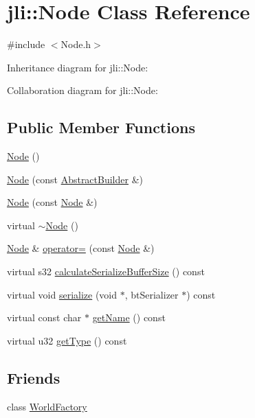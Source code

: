 \hypertarget{classjli_1_1_node}{\section{jli\+:\+:Node Class Reference}
\label{classjli_1_1_node}
}


{\ttfamily \#include $<$Node.\+h$>$}



Inheritance diagram for jli\+:\+:Node\+:


Collaboration diagram for jli\+:\+:Node\+:
\subsection*{Public Member Functions}
\begin{DoxyCompactItemize}
\item 
\hyperlink{classjli_1_1_node_ad3ae8427886d6e7375c62a7fb2100c4c}{Node} ()
\item 
\hyperlink{classjli_1_1_node_ac427b39c9353f0301e191f76d360d4f1}{Node} (const \hyperlink{classjli_1_1_abstract_builder}{Abstract\+Builder} \&)
\item 
\hyperlink{classjli_1_1_node_ad63185457aa77be28b780050799426f3}{Node} (const \hyperlink{classjli_1_1_node}{Node} \&)
\item 
virtual \hyperlink{classjli_1_1_node_ac46db977b2fba42d8384ccab749c9cd4}{$\sim$\+Node} ()
\item 
\hyperlink{classjli_1_1_node}{Node} \& \hyperlink{classjli_1_1_node_abbd88d2e7fcd847329cfc29f6919c40d}{operator=} (const \hyperlink{classjli_1_1_node}{Node} \&)
\item 
virtual s32 \hyperlink{classjli_1_1_node_a8075e2769a86cb0e9fa51840da53513b}{calculate\+Serialize\+Buffer\+Size} () const 
\item 
virtual void \hyperlink{classjli_1_1_node_a1dc93453f2923153cd37293bb56e6c54}{serialize} (void $\ast$, bt\+Serializer $\ast$) const 
\item 
virtual const char $\ast$ \hyperlink{classjli_1_1_node_aed60180fffdc02a1d7d598cd0595b9aa}{get\+Name} () const 
\item 
virtual u32 \hyperlink{classjli_1_1_node_a533217d7405544590a6a28fdaeec9208}{get\+Type} () const 
\end{DoxyCompactItemize}
\subsection*{Friends}
\begin{DoxyCompactItemize}
\item 
class \hyperlink{classjli_1_1_node_acb96ebb09abe8f2a37a915a842babfac}{World\+Factory}
\end{DoxyCompactItemize}


